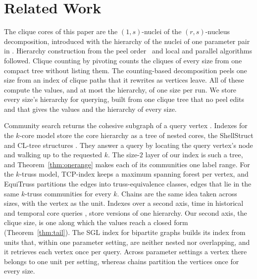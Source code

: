 \section{Related Work}\label{sec:related}

The clique cores of this paper are the $(1,s)$-nuclei of the $(r,s)$-nucleus decomposition, introduced with the hierarchy of the nuclei of one parameter pair in \cite{firstNucleus,nuclearTWEB}.
%
Hierarchy construction from the peel order~\cite{fastHierarchy} and local \cite{LocalNuclear} and parallel \cite{sotaPrveHierarchy,sotaHierarchy} algorithms followed.
%
Clique counting by pivoting \cite{Pivoter,YeSIGMOD2022Lightning} counts the cliques of every size from one compact tree without listing them.
%
The counting-based decomposition \cnd \cite{Zhang2026NucleusCounting} peels one size from an index of clique paths that it rewrites as vertices leave.
%
All of these compute the values, and at most the hierarchy, of one size per run.
%
We store every size's hierarchy for querying, built from one clique tree that no peel edits and that gives the values and the hierarchy of every size.

Community search returns the cohesive subgraph of a query vertex \cite{SozioGionisKDD2010,Cui2014Local,Fang2020Survey}.
%
Indexes for the $k$-core model store the core hierarchy as a tree of nested cores, the ShellStruct and CL-tree structures \cite{Barbieri2015ShellStruct,Fang2016CLtree}.
%
They answer a query by locating the query vertex's node and walking up to the requested $k$.
%
The size-$2$ layer of our index is such a tree, and Theorem~\ref{thm:onerange} makes each of its communities one label range.
%
For the $k$-truss model, TCP-index \cite{huang2014truss} keeps a maximum spanning forest per vertex, and EquiTruss \cite{akbas2017truss} partitions the edges into truss-equivalence classes, edges that lie in the same $k$-truss communities for every $k$.
%
Chains are the same idea taken across sizes, with the vertex as the unit.
%
Indexes over a second axis, time in historical and temporal core queries \cite{core_res1,tian2024abcore}, store versions of one hierarchy.
%
Our second axis, the clique size, is one along which the values reach a closed form (Theorem~\ref{thm:tail}).
%
The SGL index for bipartite graphs \cite{SGL} builds its index from units that, within one parameter setting, are neither nested nor overlapping, and it retrieves each vertex once per query.
%
Across parameter settings a vertex there belongs to one unit per setting, whereas chains partition the vertices once for every size.
